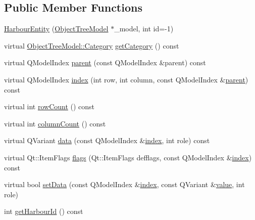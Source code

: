 \subsection*{Public Member Functions}
\begin{DoxyCompactItemize}
\item 
\mbox{\hyperlink{classobjecttree_1_1_harbour_entity_ad4ce58a82a5112465ab462fe5fb436d2}{Harbour\+Entity}} (\mbox{\hyperlink{class_object_tree_model}{Object\+Tree\+Model}} $\ast$\+\_\+model, int id=-\/1)
\item 
virtual \mbox{\hyperlink{class_object_tree_model_a379e9d6b0d381853785adf62095ba4e3}{Object\+Tree\+Model\+::\+Category}} \mbox{\hyperlink{classobjecttree_1_1_harbour_entity_aa9a65ed7043466958c0da886ed525af9}{get\+Category}} () const
\item 
virtual Q\+Model\+Index \mbox{\hyperlink{classobjecttree_1_1_harbour_entity_ab778a458c3da89ac66399c724b5626eb}{parent}} (const Q\+Model\+Index \&parent) const
\item 
virtual Q\+Model\+Index \mbox{\hyperlink{classobjecttree_1_1_harbour_entity_a70b27c05c76b447a183c05a1318e96ee}{index}} (int row, int column, const Q\+Model\+Index \&\mbox{\hyperlink{classobjecttree_1_1_harbour_entity_ab778a458c3da89ac66399c724b5626eb}{parent}}) const
\item 
virtual int \mbox{\hyperlink{classobjecttree_1_1_harbour_entity_a7573679069c91cd1ecf631052952253f}{row\+Count}} () const
\item 
virtual int \mbox{\hyperlink{classobjecttree_1_1_harbour_entity_a4b3230c7f686e812b961fdc5f5956925}{column\+Count}} () const
\item 
virtual Q\+Variant \mbox{\hyperlink{classobjecttree_1_1_harbour_entity_aa18c43711523e417d5c7d1b71de2033f}{data}} (const Q\+Model\+Index \&\mbox{\hyperlink{classobjecttree_1_1_harbour_entity_a70b27c05c76b447a183c05a1318e96ee}{index}}, int role) const
\item 
virtual Qt\+::\+Item\+Flags \mbox{\hyperlink{classobjecttree_1_1_harbour_entity_af7bd7bc6f18e5fe8f8fac7cdce4fbe21}{flags}} (Qt\+::\+Item\+Flags defflags, const Q\+Model\+Index \&\mbox{\hyperlink{classobjecttree_1_1_harbour_entity_a70b27c05c76b447a183c05a1318e96ee}{index}}) const
\item 
virtual bool \mbox{\hyperlink{classobjecttree_1_1_harbour_entity_adaa8cebd8e3b69c4cfed614a5b81fdfd}{set\+Data}} (const Q\+Model\+Index \&\mbox{\hyperlink{classobjecttree_1_1_harbour_entity_a70b27c05c76b447a183c05a1318e96ee}{index}}, const Q\+Variant \&\mbox{\hyperlink{diffusion_8cpp_a4b41795815d9f3d03abfc739e666d5da}{value}}, int role)
\item 
int \mbox{\hyperlink{classobjecttree_1_1_harbour_entity_a9d632d259a60d7ff224966186e3e47cc}{get\+Harbour\+Id}} () const
\end{DoxyCompactItemize}
